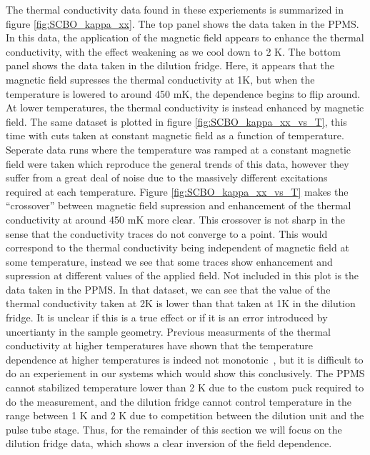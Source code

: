 \documentclass{thesis-umich}
\begin{document}
The thermal conductivity data found in these experiements is summarized in figure \ref{fig:SCBO_kappa_xx}. The top panel shows the data taken in the PPMS. In this data, the application of the magnetic field appears to enhance the thermal conductivity, with the effect weakening as we cool down to 2 K. The bottom panel shows the data taken in the dilution fridge. Here, it appears that the magnetic field supresses the thermal conductivity at 1K, but when the temperature is lowered to around 450 mK, the dependence begins to flip around. At lower temperatures, the thermal conductivity is instead enhanced by magnetic field. The same dataset is plotted in figure \ref{fig:SCBO_kappa_xx_vs_T}, this time with cuts taken at constant magnetic field as a function of temperature. Seperate data runs where the temperature was ramped at a constant magnetic field were taken which reproduce the general trends of this data, however they suffer from a great deal of noise due to the massively different excitations required at each temperature. Figure \ref{fig:SCBO_kappa_xx_vs_T} makes the ``crossover'' between magnetic field supression and enhancement of the thermal conductivity at around 450 mK more clear. This crossover is not sharp in the sense that the conductivity traces do not converge to a point. This would correspond to the thermal conductivity being independent of magnetic field at some temperature, instead we see that some traces show enhancement and supression at different values of the applied field. Not included in this plot is the data taken in the PPMS. In that dataset, we can see that the value of the thermal conductivity taken at 2K is lower than that taken at 1K in the dilution fridge. It is unclear if this is a true effect or if it is an error introduced by uncertianty in the sample geometry. Previous measurments of the thermal conductivity at higher temperatures have shown that the temperature dependence at higher temperatures is indeed not monotonic~\cite{Hofmann2001}, but it is difficult to do an experiement in our systems which would show this conclusively. The PPMS cannot stabilized temperature lower than 2 K due to the custom puck required to do the measurement, and the dilution fridge cannot control temperature in the range between 1 K and 2 K due to competition between the dilution unit and the pulse tube stage. Thus, for the remainder of this section we will focus on the dilution fridge data, which shows a clear inversion of the field dependence.
\end{document}
